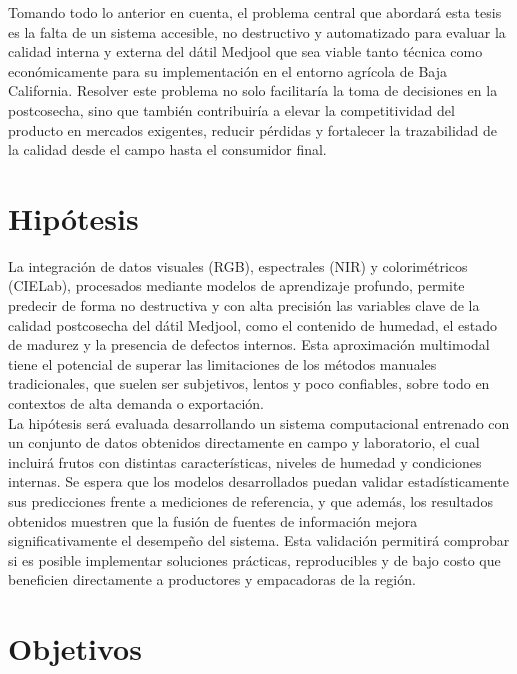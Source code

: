 Tomando todo lo anterior en cuenta, el problema central que abordará esta tesis es la falta de un sistema accesible, no destructivo y automatizado para evaluar la calidad interna y externa del dátil Medjool que sea viable tanto técnica como económicamente para su implementación en el entorno agrícola de Baja California. Resolver este problema no solo facilitaría la toma de decisiones en la postcosecha, sino que también contribuiría a elevar la competitividad del producto en mercados exigentes, reducir pérdidas y fortalecer la trazabilidad de la calidad desde el campo hasta el consumidor final.


\section{Hipótesis}

La integración de datos visuales (RGB), espectrales (NIR) y colorimétricos (CIELab), procesados mediante modelos de aprendizaje profundo, permite predecir de forma no destructiva y con alta precisión las variables clave de la calidad postcosecha del dátil Medjool, como el contenido de humedad, el estado de madurez y la presencia de defectos internos. Esta aproximación multimodal tiene el potencial de superar las limitaciones de los métodos manuales tradicionales, que suelen ser subjetivos, lentos y poco confiables, sobre todo en contextos de alta demanda o exportación.\\

La hipótesis será evaluada desarrollando un sistema computacional entrenado con un conjunto de datos obtenidos directamente en campo y laboratorio, el cual incluirá frutos con distintas características, niveles de humedad y condiciones internas. Se espera que los modelos desarrollados puedan validar estadísticamente sus predicciones frente a mediciones de referencia, y que además, los resultados obtenidos muestren que la fusión de fuentes de información mejora significativamente el desempeño del sistema. Esta validación permitirá comprobar si es posible implementar soluciones prácticas, reproducibles y de bajo costo que beneficien directamente a productores y empacadoras de la región.


\section{Objetivos}

